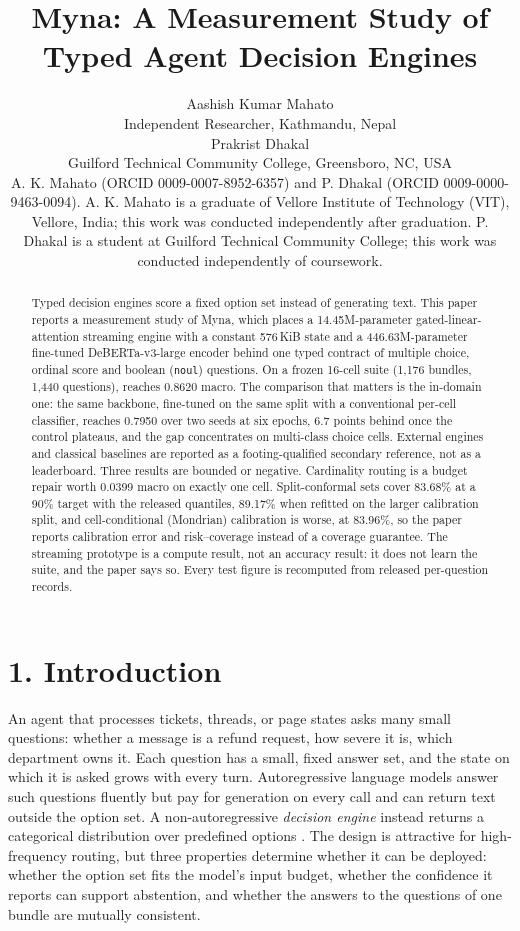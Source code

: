 \documentclass[11pt]{article}
\title{Myna: A Measurement Study of Typed Agent Decision Engines}
\author{Aashish Kumar Mahato\\Independent Researcher, Kathmandu, Nepal\\[4pt]
Prakrist Dhakal\\Guilford Technical Community College, Greensboro, NC, USA\\[4pt]
\small A. K. Mahato (ORCID 0009-0007-8952-6357) and P. Dhakal (ORCID 0009-0000-9463-0094).
\small A. K. Mahato is a graduate of Vellore Institute of Technology (VIT), Vellore, India; this work was conducted independently after graduation. P. Dhakal is a student at Guilford Technical Community College; this work was conducted independently of coursework.}
\begin{document}
\maketitle
\begin{abstract}
Typed decision engines score a fixed option set instead of generating text. This paper reports a measurement study of Myna, which places a 14.45M-parameter gated-linear-attention streaming engine with a constant 576\,KiB state and a 446.63M-parameter fine-tuned DeBERTa-v3-large encoder behind one typed contract of multiple choice, ordinal score and boolean (\texttt{noul}) questions. On a frozen 16-cell suite (1,176 bundles, 1,440 questions), \vsix{} reaches 0.8620 macro. The comparison that matters is the in-domain one: the same backbone, fine-tuned on the same split with a conventional per-cell classifier, reaches 0.7950 over two seeds at six epochs, 6.7 points behind once the control plateaus, and the gap concentrates on multi-class choice cells. External engines and classical baselines are reported as a footing-qualified secondary reference, not as a leaderboard. Three results are bounded or negative. Cardinality routing is a budget repair worth 0.0399 macro on exactly one cell. Split-conformal sets cover 83.68\% at a 90\% target with the released quantiles, 89.17\% when refitted on the larger calibration split, and cell-conditional (Mondrian) calibration is worse, at 83.96\%, so the paper reports calibration error and risk--coverage instead of a coverage guarantee. The streaming prototype is a compute result, not an accuracy result: it does not learn the suite, and the paper says so. Every test figure is recomputed from released per-question records.
\end{abstract}
\section*{1. Introduction}
An agent that processes tickets, threads, or page states asks many small questions: whether a
message is a refund request, how severe it is, which department owns it. Each question has a
small, fixed answer set, and the state on which it is asked grows with every turn.
Autoregressive language models answer such questions fluently but pay for generation on every
call and can return text outside the option set. A non-autoregressive \emph{decision engine}
instead returns a categorical distribution over predefined options
\citep{li2026jev,duan2026gdm}. The design is attractive for high-frequency routing, but three
properties determine whether it can be deployed: whether the option set fits the model's input
budget, whether the confidence it reports can support abstention, and whether the answers to the
questions of one bundle are mutually consistent.
\end{document}
